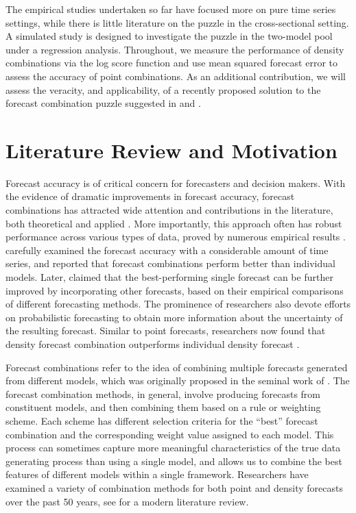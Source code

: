 \documentclass{monashthesis}
\begin{document}
The empirical studies undertaken so far have focused more on pure time series settings, while there is little literature on the puzzle in the cross-sectional setting. A simulated study is designed to investigate the puzzle in the two-model pool under a regression analysis. Throughout, we measure the performance of density combinations via the log score function and use mean squared forecast error to assess the accuracy of point combinations. As an additional contribution, we will assess the veracity, and applicability, of a recently proposed solution to the forecast combination puzzle suggested in \textcite{ZMFP22} and \textcite{FZMP23}.

\hypertarget{literature-review-and-motivation}{%
\section{Literature Review and Motivation}\label{literature-review-and-motivation}}

Forecast accuracy is of critical concern for forecasters and decision makers. With the evidence of dramatic improvements in forecast accuracy, forecast combinations has attracted wide attention and contributions in the literature, both theoretical and applied \autocite{C89,T06}. More importantly, this approach often has robust performance across various types of data, proved by numerous empirical results \autocite{GA11}. \textcite{MACF82} carefully examined the forecast accuracy with a considerable amount of time series, and reported that forecast combinations perform better than individual models. Later, \textcite{SW98} claimed that the best-performing single forecast can be further improved by incorporating other forecasts, based on their empirical comparisons of different forecasting methods. The prominence of researchers also devote efforts on probabilistic forecasting to obtain more information about the uncertainty of the resulting forecast. Similar to point forecasts, researchers now found that density forecast combination outperforms individual density forecast \autocites[e.g.,][]{HM07,GA11}.

Forecast combinations refer to the idea of combining multiple forecasts generated from different models, which was originally proposed in the seminal work of \textcite{BG69}. The forecast combination methods, in general, involve producing forecasts from constituent models, and then combining them based on a rule or weighting scheme. Each scheme has different selection criteria for the ``best'' forecast combination and the corresponding weight value assigned to each model. This process can sometimes capture more meaningful characteristics of the true data generating process than using a single model, and allows us to combine the best features of different models within a single framework. Researchers have examined a variety of combination methods for both point and density forecasts over the past 50 years, see \textcite{WHLK22} for a modern literature review.
\end{document}
